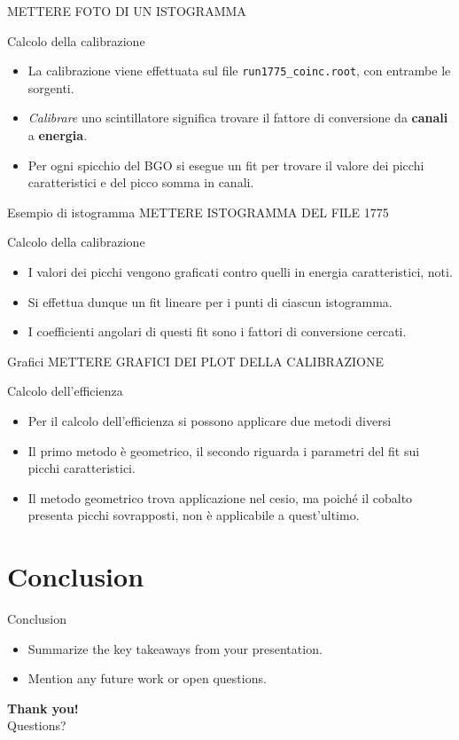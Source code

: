 \documentclass [xcolor=svgnames] {beamer}
\begin{document}
\begin{frame}
	METTERE FOTO DI UN ISTOGRAMMA
\end{frame}

\begin{frame}{Calcolo della calibrazione}
	\begin{itemize}
		\item La calibrazione viene effettuata sul file \texttt{run1775\_coinc.root}, con entrambe le sorgenti.
		\item \emph{Calibrare} uno scintillatore significa trovare il fattore di conversione da \textbf{canali} a \textbf{energia}.
		\item Per ogni spicchio del BGO si esegue un fit per trovare il valore dei picchi caratteristici e del picco somma in canali.
	\end{itemize}
\end{frame}

\begin{frame}{Esempio di istogramma}
	METTERE ISTOGRAMMA DEL FILE 1775
\end{frame}

\begin{frame}{Calcolo della calibrazione}
	\begin{itemize}
			\item I valori dei picchi vengono graficati contro quelli in energia caratteristici, noti.
		\item Si effettua dunque un fit lineare per i punti di ciascun istogramma.
		\item I coefficienti angolari di questi fit sono i fattori di conversione cercati.
	\end{itemize}
\end{frame}

\begin{frame}{Grafici}
	METTERE GRAFICI DEI PLOT DELLA CALIBRAZIONE
\end{frame}

\begin{frame}{Calcolo dell'efficienza}
	\begin{itemize}
		\item Per il calcolo dell'efficienza si possono applicare due metodi diversi
		\item Il primo metodo è geometrico, il secondo riguarda i parametri del fit sui picchi caratteristici.
		\item Il metodo geometrico trova applicazione nel cesio, ma poiché il cobalto presenta picchi sovrapposti, non è applicabile a quest'ultimo.
	\end{itemize}
\end{frame}
	
	\section{Conclusion}
	\begin{frame}{Conclusion}
		\begin{itemize}
			\item Summarize the key takeaways from your presentation.
			\item Mention any future work or open questions.
		\end{itemize}
	\end{frame}
	
	\begin{frame}
		\centering
		\textbf{Thank you!}\\
		Questions?
	\end{frame}
	
\end{document}
